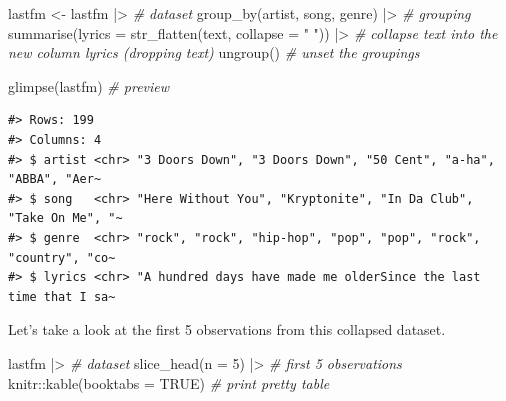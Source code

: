 \documentclass[
  letterpaper,
]{scrbook}
\newenvironment{Shaded}{\begin{snugshade}}{\end{snugshade}}
\newcommand{\AttributeTok}[1]{\textcolor[rgb]{0.00,0.00,0.00}{#1}}
\newcommand{\CommentTok}[1]{\textcolor[rgb]{0.00,0.00,0.00}{\textit{#1}}}
\newcommand{\ConstantTok}[1]{\textcolor[rgb]{0.00,0.00,0.00}{#1}}
\newcommand{\DecValTok}[1]{\textcolor[rgb]{0.00,0.00,0.00}{#1}}
\newcommand{\FunctionTok}[1]{\textcolor[rgb]{0.00,0.00,0.00}{#1}}
\newcommand{\NormalTok}[1]{\textcolor[rgb]{0.00,0.00,0.00}{#1}}
\newcommand{\OtherTok}[1]{\textcolor[rgb]{0.00,0.00,0.00}{#1}}
\newcommand{\SpecialCharTok}[1]{\textcolor[rgb]{0.00,0.00,0.00}{#1}}
\newcommand{\StringTok}[1]{\textcolor[rgb]{0.00,0.00,0.00}{#1}}
\begin{document}
\begin{Shaded}
\begin{Highlighting}[]
\NormalTok{lastfm }\OtherTok{\textless{}{-}} 
\NormalTok{  lastfm }\SpecialCharTok{|\textgreater{}} \CommentTok{\# dataset}
  \FunctionTok{group\_by}\NormalTok{(artist, song, genre) }\SpecialCharTok{|\textgreater{}} \CommentTok{\# grouping}
  \FunctionTok{summarise}\NormalTok{(}\AttributeTok{lyrics =} \FunctionTok{str\_flatten}\NormalTok{(text, }\AttributeTok{collapse =} \StringTok{" "}\NormalTok{)) }\SpecialCharTok{|\textgreater{}}  \CommentTok{\# collapse text into the new column \textasciigrave{}lyrics\textasciigrave{} (dropping \textasciigrave{}text\textasciigrave{})}
  \FunctionTok{ungroup}\NormalTok{() }\CommentTok{\# unset the groupings}

\FunctionTok{glimpse}\NormalTok{(lastfm) }\CommentTok{\# preview}
\end{Highlighting}
\end{Shaded}

\begin{verbatim}
#> Rows: 199
#> Columns: 4
#> $ artist <chr> "3 Doors Down", "3 Doors Down", "50 Cent", "a-ha", "ABBA", "Aer~
#> $ song   <chr> "Here Without You", "Kryptonite", "In Da Club", "Take On Me", "~
#> $ genre  <chr> "rock", "rock", "hip-hop", "pop", "pop", "rock", "country", "co~
#> $ lyrics <chr> "A hundred days have made me olderSince the last time that I sa~
\end{verbatim}

Let's take a look at the first 5 observations from this collapsed
dataset.

\begin{Shaded}
\begin{Highlighting}[]
\NormalTok{lastfm }\SpecialCharTok{|\textgreater{}} \CommentTok{\# dataset}
  \FunctionTok{slice\_head}\NormalTok{(}\AttributeTok{n =} \DecValTok{5}\NormalTok{) }\SpecialCharTok{|\textgreater{}} \CommentTok{\# first 5 observations}
\NormalTok{  knitr}\SpecialCharTok{::}\FunctionTok{kable}\NormalTok{(}\AttributeTok{booktabs =} \ConstantTok{TRUE}\NormalTok{) }\CommentTok{\# print pretty table}
\end{Highlighting}
\end{Shaded}
\end{document}

